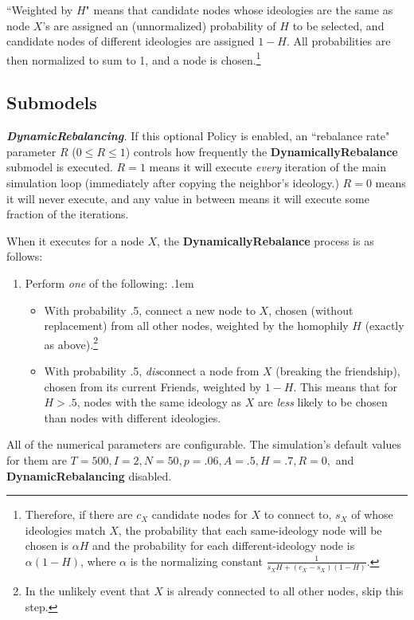 ``Weighted by $H$" means that candidate nodes whose ideologies are the same as
node $X$'s are assigned an (unnormalized) probability of $H$ to be selected,
and candidate nodes of different ideologies are assigned $1-H$. All
probabilities are then normalized to sum to 1, and a node is chosen.\footnote{
Therefore, if there are $c_X$ candidate nodes for $X$ to connect to, $s_X$ of
whose ideologies match $X$, the probability that each same-ideology node will
be chosen is $\alpha H$ and the probability for each different-ideology node
is $\alpha (1-H)$, where $\alpha$ is the normalizing constant $\frac{1}{s_X H
+ (c_X-s_X)(1-H)}$.}



\subsection{Submodels}

\textit{\textbf{DynamicRebalancing}.} If this optional Policy is enabled, an
``rebalance rate" parameter $R$ ($0 \leq R \leq 1$) controls how frequently
the \textbf{DynamicallyRebalance} submodel is executed. $R=1$ means it will
execute \textit{every} iteration of the main simulation loop (immediately
after copying the neighbor's ideology.) $R=0$ means it will never execute, and
any value in between means it will execute some fraction of the iterations.

When it executes for a node $X$, the \textbf{DynamicallyRebalance} process is
as follows:
\begin{enumerate}
\item Perform \textit{one} of the following:
\itemsep.1em
\begin{itemize}
\item With probability .5, connect a new node to $X$, chosen (without
replacement) from all other nodes, weighted by the homophily $H$ (exactly as
above).\footnote{In the unlikely event that $X$ is already connected to all
other nodes, skip this step.}
\item With probability .5, \textit{dis}connect a node from $X$ (breaking the
friendship), chosen from its current Friends, weighted by $1-H$. This means
that for $H>.5$, nodes with the same ideology as $X$ are \textit{less} likely
to be chosen than nodes with different ideologies.
\end{itemize}
\end{enumerate}



All of the numerical parameters are configurable. The simulation's default
values for them are $T=500, I=2, N=50, p=.06, A=.5, H=.7, R=0,$ and
\textbf{DynamicRebalancing} disabled.
